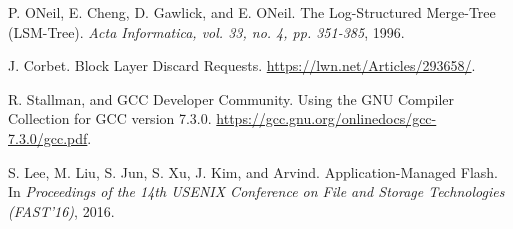 \begin{thebibliography}{00}
P. ONeil, E. Cheng, D. Gawlick, and E. ONeil.
The Log-Structured Merge-Tree (LSM-Tree).
\textit{Acta Informatica, vol. 33, no. 4, pp. 351-385}, 1996.

J. Corbet.
Block Layer Discard Requests.
\url{https://lwn.net/Articles/293658/}.

R. Stallman, and GCC Developer Community.
Using the GNU Compiler Collection for GCC version 7.3.0.
\url{https://gcc.gnu.org/onlinedocs/gcc-7.3.0/gcc.pdf}.


S. Lee, M. Liu, S. Jun, S. Xu, J. Kim, and Arvind.
Application-Managed Flash.
In \textit{Proceedings of the 14th USENIX Conference on File and Storage
Technologies (FAST'16)}, 2016.

\end{thebibliography}
